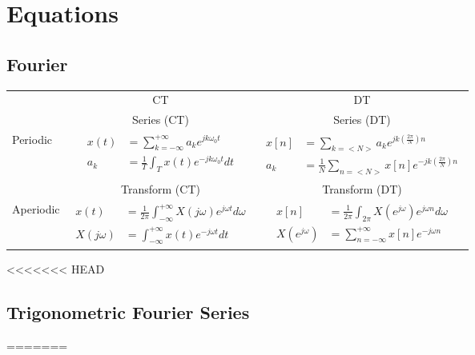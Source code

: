 \section*{Equations}
\subsection*{Fourier}
{\centering
{\renewcommand{\arraystretch}{4}%
    \begin{tabular}{lcc}

    & CT & DT\\
        \cline{2-3}
    & Series (CT) & Series (DT)\\
    \cline{2-3}
    Periodic &
    $\begin{aligned}
        x(t) &= \sum_{k=-\infty}^{+\infty}a_k e^{jk\omega_0 t}\\
        a_k &= \frac{1}{T} \int_{T}x(t)e^{-jk\omega_0 t}dt
    \end{aligned}$\par

    &
    $\begin{aligned}
        x[n] &= \sum_{k=<N>}a_k e^{jk\left(\frac{2\pi}{N}\right) n}\\
        a_k &= \frac{1}{N} \sum_{n=<N>}x[n]e^{-jk\left(\frac{2\pi}{N}\right)n}
    \end{aligned}$\par
    \\[4ex]
        \cline{2-3}
     & Transform (CT) & Transform (DT)\\
    \cline{2-3}
    Aperiodic &
    $\begin{aligned}
        x(t) &= \frac{1}{2\pi}\int_{-\infty}^{+\infty} X(j\omega)e^{j\omega t}d\omega\\
        X(j\omega) &=  \int_{-\infty}^{+\infty}x(t)e^{-j\omega t}dt
    \end{aligned}$\par

    &


    $\begin{aligned}
        x[n] &= \frac{1}{2\pi}\int_{2\pi} X(e^{j\omega})e^{j\omega n}d\omega\\
        X(e^{j\omega}) &= \sum_{n=-\infty}^{+\infty}x[n]e^{-j\omega n}
    \end{aligned}$\par
    \\[4ex]
        \cline{2-3}
    \end{tabular}
    }
<<<<<<< HEAD
    
        \subsection*{Trigonometric Fourier Series}
=======
}

